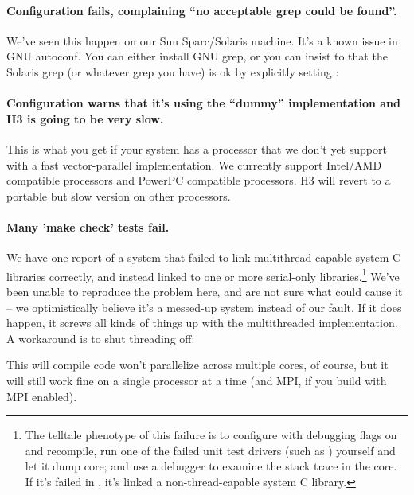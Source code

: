 
\paragraph{Configuration fails, complaining ``no acceptable grep could
  be found''.} We've seen this happen on our Sun Sparc/Solaris
machine. It's a known issue in GNU autoconf. You can either install
GNU grep, or you can insist to  that the Solaris
grep (or whatever grep you have) is ok by explicitly setting
:


\paragraph{Configuration warns that it's using the ``dummy''
implementation and H3 is going to be very slow.} This is what you get if
your system has a processor that we don't yet support with a fast
vector-parallel implementation. We currently support Intel/AMD
compatible processors and PowerPC compatible processors.  H3 will
revert to a portable but slow version on other processors.

\paragraph{Many 'make check' tests fail.} We have one report of a
system that failed to link multithread-capable system C libraries
correctly, and instead linked to one or more serial-only
libraries.\footnote{The telltale phenotype of this failure is to
  configure with debugging flags on and recompile, run one of the
  failed unit test drivers (such as )
  yourself and let it dump core; and use a debugger to examine the
  stack trace in the core. If it's failed in
  , it's linked a non-thread-capable
  system C library.} We've been unable to reproduce the problem here,
and are not sure what could cause it -- we optimistically believe it's
a messed-up system instead of our fault. If it does happen, it screws
all kinds of things up with the multithreaded implementation. A
workaround is to shut threading off:


This will compile code won't parallelize across multiple cores, of
course, but it will still work fine on a single processor at a time
(and MPI, if you build with MPI enabled).

